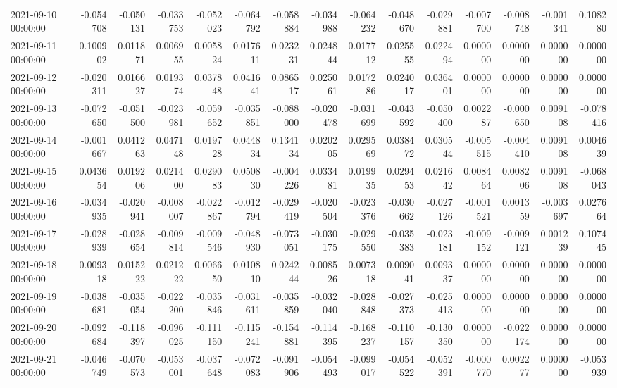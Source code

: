 \begin{tabular}{lrrrrrrrrrrrrrr}
2021-09-10 00:00:00 & -0.054708 & -0.050131 & -0.033753 & -0.052023 & -0.064792 & -0.058884 & -0.034988 & -0.064232 & -0.048670 & -0.029881 & -0.007700 & -0.008748 & -0.001341 & 0.108280 \\
2021-09-11 00:00:00 & 0.100902 & 0.011871 & 0.006955 & 0.005824 & 0.017611 & 0.023231 & 0.024844 & 0.017712 & 0.025555 & 0.022494 & 0.000000 & 0.000000 & 0.000000 & 0.000000 \\
2021-09-12 00:00:00 & -0.020311 & 0.016627 & 0.019374 & 0.037848 & 0.041641 & 0.086517 & 0.025061 & 0.017286 & 0.024017 & 0.036401 & 0.000000 & 0.000000 & 0.000000 & 0.000000 \\
2021-09-13 00:00:00 & -0.072650 & -0.051500 & -0.023981 & -0.059652 & -0.035851 & -0.088000 & -0.020478 & -0.031699 & -0.043592 & -0.050400 & 0.002287 & -0.000650 & 0.009108 & -0.078416 \\
2021-09-14 00:00:00 & -0.001667 & 0.041263 & 0.047148 & 0.019728 & 0.044834 & 0.134134 & 0.020205 & 0.029569 & 0.038472 & 0.030544 & -0.005515 & -0.004410 & 0.009108 & 0.004639 \\
2021-09-15 00:00:00 & 0.043654 & 0.019206 & 0.021400 & 0.029083 & 0.050830 & -0.004226 & 0.033481 & 0.019935 & 0.029453 & 0.021642 & 0.008464 & 0.008206 & 0.009108 & -0.068043 \\
2021-09-16 00:00:00 & -0.034935 & -0.020941 & -0.008007 & -0.022867 & -0.012794 & -0.029419 & -0.020504 & -0.023376 & -0.030662 & -0.027126 & -0.001521 & 0.001359 & -0.003697 & 0.027664 \\
2021-09-17 00:00:00 & -0.028939 & -0.028654 & -0.009814 & -0.009546 & -0.048930 & -0.073051 & -0.030175 & -0.029550 & -0.035383 & -0.023181 & -0.009152 & -0.009121 & 0.001239 & 0.107445 \\
2021-09-18 00:00:00 & 0.009318 & 0.015222 & 0.021222 & 0.006650 & 0.010810 & 0.024244 & 0.008526 & 0.007318 & 0.009041 & 0.009337 & 0.000000 & 0.000000 & 0.000000 & 0.000000 \\
2021-09-19 00:00:00 & -0.038681 & -0.035054 & -0.022200 & -0.035846 & -0.031611 & -0.035859 & -0.032040 & -0.028848 & -0.027373 & -0.025413 & 0.000000 & 0.000000 & 0.000000 & 0.000000 \\
2021-09-20 00:00:00 & -0.092684 & -0.118397 & -0.096025 & -0.111150 & -0.115241 & -0.154881 & -0.114395 & -0.168237 & -0.110157 & -0.130350 & 0.000000 & -0.022174 & 0.000000 & 0.000000 \\
2021-09-21 00:00:00 & -0.046749 & -0.070573 & -0.053001 & -0.037648 & -0.072083 & -0.091906 & -0.054493 & -0.099017 & -0.054522 & -0.052391 & -0.000770 & 0.002277 & 0.000000 & -0.053939 \\

\end{tabular}
